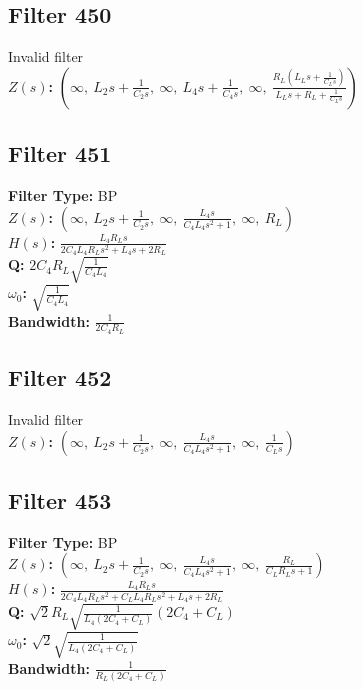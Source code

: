 \documentclass{article}
\begin{document}
\subsection*{Filter 450}
Invalid filter \\ 
\textbf{$Z(s)$:} $\left( \infty, \  L_{2} s + \frac{1}{C_{2} s}, \  \infty, \  L_{4} s + \frac{1}{C_{4} s}, \  \infty, \  \frac{R_{L} \left(L_{L} s + \frac{1}{C_{L} s}\right)}{L_{L} s + R_{L} + \frac{1}{C_{L} s}}\right)$ \\ 
\subsection*{Filter 451}
\textbf{Filter Type:} BP \\ 
\textbf{$Z(s)$:} $\left( \infty, \  L_{2} s + \frac{1}{C_{2} s}, \  \infty, \  \frac{L_{4} s}{C_{4} L_{4} s^{2} + 1}, \  \infty, \  R_{L}\right)$ \\ 
\textbf{$H(s)$:} $\frac{L_{4} R_{L} s}{2 C_{4} L_{4} R_{L} s^{2} + L_{4} s + 2 R_{L}}$ \\ 
\textbf{Q:} $2 C_{4} R_{L} \sqrt{\frac{1}{C_{4} L_{4}}}$ \\ 
\textbf{$\omega_0$:} $\sqrt{\frac{1}{C_{4} L_{4}}}$ \\ 
\textbf{Bandwidth:} $\frac{1}{2 C_{4} R_{L}}$ \\ 
\subsection*{Filter 452}
Invalid filter \\ 
\textbf{$Z(s)$:} $\left( \infty, \  L_{2} s + \frac{1}{C_{2} s}, \  \infty, \  \frac{L_{4} s}{C_{4} L_{4} s^{2} + 1}, \  \infty, \  \frac{1}{C_{L} s}\right)$ \\ 
\subsection*{Filter 453}
\textbf{Filter Type:} BP \\ 
\textbf{$Z(s)$:} $\left( \infty, \  L_{2} s + \frac{1}{C_{2} s}, \  \infty, \  \frac{L_{4} s}{C_{4} L_{4} s^{2} + 1}, \  \infty, \  \frac{R_{L}}{C_{L} R_{L} s + 1}\right)$ \\ 
\textbf{$H(s)$:} $\frac{L_{4} R_{L} s}{2 C_{4} L_{4} R_{L} s^{2} + C_{L} L_{4} R_{L} s^{2} + L_{4} s + 2 R_{L}}$ \\ 
\textbf{Q:} $\sqrt{2} R_{L} \sqrt{\frac{1}{L_{4} \left(2 C_{4} + C_{L}\right)}} \left(2 C_{4} + C_{L}\right)$ \\ 
\textbf{$\omega_0$:} $\sqrt{2} \sqrt{\frac{1}{L_{4} \left(2 C_{4} + C_{L}\right)}}$ \\ 
\textbf{Bandwidth:} $\frac{1}{R_{L} \left(2 C_{4} + C_{L}\right)}$ \\ 
\end{document}
